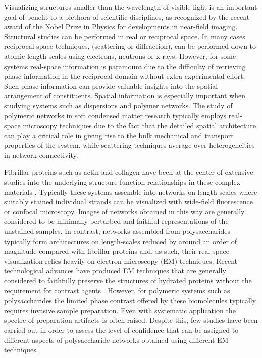 Visualizing structures smaller than the wavelength of visible light is an important goal of benefit to a plethora of scientific disciplines, as recognized by the recent award of the Nobel Prize in Physics for developments in near-field imaging. Structural studies can be performed in real or reciprocal space. In many cases reciprocal space techniques, (scattering or diffraction), can be performed down to atomic length-scales using electrons, neutrons or x-rays. However, for some systems real-space information is paramount due to the difficulty of retrieving phase information in the reciprocal domain without extra experimental effort. Such phase information can provide valuable insights into the spatial arrangement of constituents. Spatial information is especially important when studying systems such as dispersions and polymer networks. The study of polymeric networks in soft condensed matter research typically employs real-space microscopy techniques due to the fact that the detailed spatial architecture can play a critical role in giving rise to the bulk mechanical \cite{onck_alternative_2005, lindstrom_finite-strain_2013} and transport \cite{walther_influence_2006,loren_dendrimer_2009} properties of the system, while scattering techniques average over heterogeneities in network connectivity.


Fibrillar proteins such as actin and collagen have been at the center of extensive studies into the underlying structure-function relationships in these complex materials \cite{broedersz_filament-length-controlled_2012}. Typically these systems assemble into networks on length-scales where suitably stained individual strands can be visualized with wide-field fluorescence or confocal microscopy. Images of networks obtained in this way are generally considered to be minimally perturbed and faithful representations of the unstained samples\cite{magatti_modeling_2013}. In contrast, networks assembled from polysaccharides typically form architectures on length-scales reduced by around an order of magnitude compared with fibrillar proteins and, as such, their real-space visualization relies heavily on electron microscopy (EM) techniques. Recent technological advances have produced  EM techniques that are generally considered to faithfully preserve the structures of hydrated proteins without the requirement for contrast agents \cite{dohnalkova_imaging_2011}. However, for polymeric systems such as polysaccharides the limited phase contrast offered by these biomolecules typically requires invasive sample preparation. Even with systematic application the spectre of preparation artifacts is often raised. Despite this, few studies have been carried out in order to assess the level of confidence that can be assigned to different aspects of polysaccharide networks obtained using different EM techniques.

